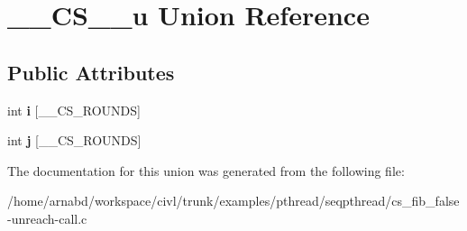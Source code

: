 \hypertarget{union____CS____u}{}\section{\+\_\+\+\_\+\+C\+S\+\_\+\+\_\+u Union Reference}
\label{union____CS____u}
\subsection*{Public Attributes}
\begin{DoxyCompactItemize}
\item 
\hypertarget{union____CS____u_ad95069319f3b8be99317f35d1c9793d5}{}int {\bfseries i} \mbox{[}\+\_\+\+\_\+\+C\+S\+\_\+\+R\+O\+U\+N\+D\+S\mbox{]}\label{union____CS____u_ad95069319f3b8be99317f35d1c9793d5}

\item 
\hypertarget{union____CS____u_a47dcafc9d59293cc760de9c10582c293}{}int {\bfseries j} \mbox{[}\+\_\+\+\_\+\+C\+S\+\_\+\+R\+O\+U\+N\+D\+S\mbox{]}\label{union____CS____u_a47dcafc9d59293cc760de9c10582c293}

\end{DoxyCompactItemize}


The documentation for this union was generated from the following file\+:\begin{DoxyCompactItemize}
\item 
/home/arnabd/workspace/civl/trunk/examples/pthread/seqpthread/cs\+\_\+fib\+\_\+false-\/unreach-\/call.\+c\end{DoxyCompactItemize}
